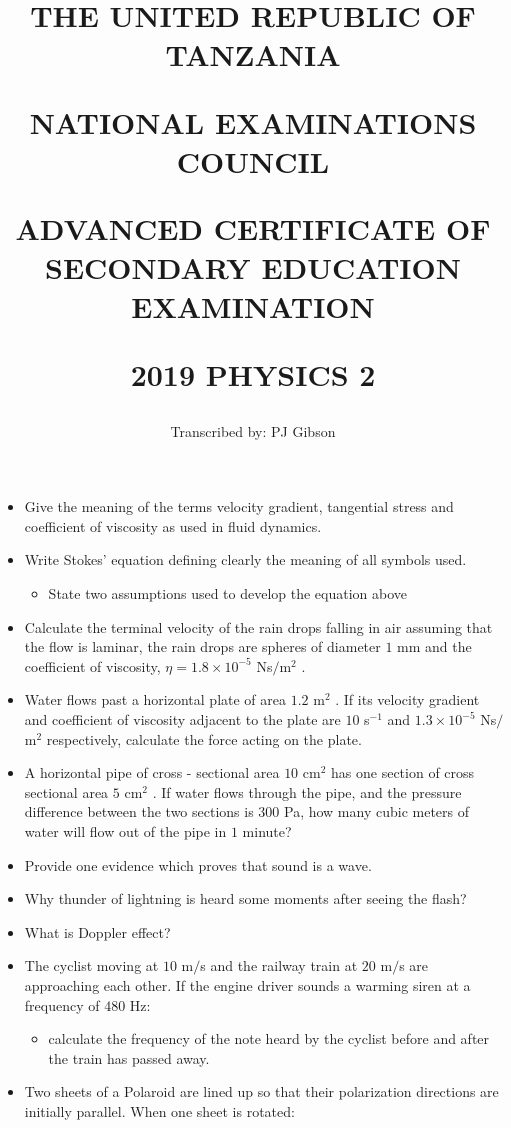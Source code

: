\documentclass{article}
\title{THE UNITED REPUBLIC OF TANZANIA

NATIONAL EXAMINATIONS COUNCIL

ADVANCED CERTIFICATE OF SECONDARY EDUCATION EXAMINATION

\textbf{2019 PHYSICS 2}}
\author{Transcribed by:  PJ Gibson}
\begin{document}
\maketitle

\begin{itemize}
\item Give the meaning of the terms velocity gradient, tangential stress and coefficient of viscosity as used in fluid dynamics.
\item Write Stokes’ equation defining clearly the meaning of all symbols used.
 \begin{itemize}
\item State two assumptions used to develop the equation above
\end{itemize}
\item Calculate the terminal velocity of the rain drops falling in air assuming that the flow is laminar, the rain drops are spheres of diameter $ 1$ mm and the coefficient of viscosity, $ \eta =1.8 \times 10^{-5}$ Ns$/$m$ ^{2}$ . 
\item Water flows past a horizontal plate of area $ 1.2$ m$ ^{2}$ . If its velocity gradient and coefficient of viscosity adjacent to the plate are $ 10$ s$ ^{-1}$ and $ 1.3 \times 10^{-5}$ Ns$/$m$ ^{2}$ respectively, calculate the force acting on the plate.  
\item A horizontal pipe of cross - sectional area $ 10 $ cm$ ^{2}$ has one section of cross sectional area $ 5 $ cm$ ^{2}$ . If water flows through the pipe, and the pressure difference between the two sections is $ 300$ Pa, how many cubic meters of water will flow out of the pipe in $ 1$ minute?
\item Provide one evidence which proves that sound is a wave.
\item Why thunder of lightning is heard some moments after seeing the flash?
\item What is Doppler effect? 
\item The cyclist moving at $ 10$ m$/$s and the railway train at $ 20$ m$/$s are approaching each other. If the engine driver sounds a warming siren at a frequency of $ 480$ Hz:
 \begin{itemize}
\item calculate the frequency of the note heard by the cyclist before and after the train has passed away. 
\end{itemize}
\item Two sheets of a Polaroid are lined up so that their polarization directions are initially parallel. When one sheet is rotated:

\end{itemize}
\end{document}
